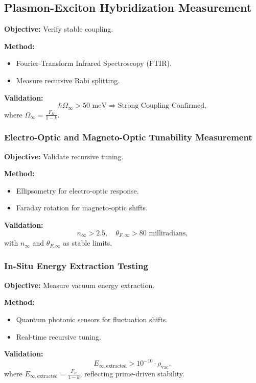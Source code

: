 \documentclass{article}
\theoremstyle{plain}
\begin{document}
\subsection{Plasmon-Exciton Hybridization Measurement}
\textbf{Objective:} Verify stable coupling.

\textbf{Method:}
\begin{itemize}
    \item Fourier-Transform Infrared Spectroscopy (FTIR).
    \item Measure recursive Rabi splitting.
\end{itemize}

\textbf{Validation:}
\begin{equation}
    \hbar \Omega_\infty > 50 \text{ meV} \Rightarrow \text{Strong Coupling Confirmed},
\end{equation}
where \( \Omega_\infty = \frac{F_\Omega}{1 - k} \).

\subsubsection{Electro-Optic and Magneto-Optic Tunability Measurement}
\textbf{Objective:} Validate recursive tuning.

\textbf{Method:}
\begin{itemize}
    \item Ellipsometry for electro-optic response.
    \item Faraday rotation for magneto-optic shifts.
\end{itemize}

\textbf{Validation:}
\begin{equation}
    n_{\infty} > 2.5, \quad \theta_{F,\infty} > 80 \text{ milliradians},
\end{equation}
with \( n_\infty \) and \( \theta_{F,\infty} \) as stable limits.

\subsubsection{In-Situ Energy Extraction Testing}
\textbf{Objective:} Measure vacuum energy extraction.

\textbf{Method:}
\begin{itemize}
    \item Quantum photonic sensors for fluctuation shifts.
    \item Real-time recursive tuning.
\end{itemize}

\textbf{Validation:}
\begin{equation}
    E_{\infty,\text{extracted}} > 10^{-10} \cdot \rho_{\text{vac}},
\end{equation}
where \( E_{\infty,\text{extracted}} = \frac{F_E}{1 - k} \), reflecting prime-driven stability.
\end{document}
